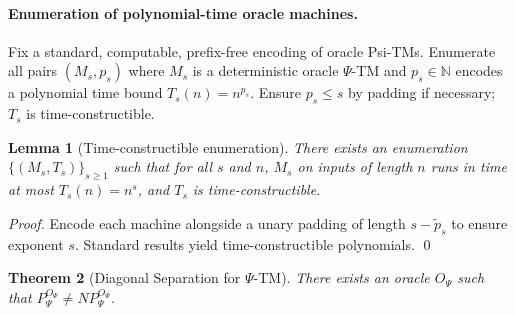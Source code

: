 \documentclass[11pt]{article}
\newtheorem{theorem}{Theorem}[section]
\newtheorem{lemma}[theorem]{Lemma}
\theoremstyle{definition}
\newcommand{\PSi}{\Psi}
\begin{document}
\paragraph{Enumeration of polynomial-time oracle machines.}
Fix a standard, computable, prefix-free encoding of oracle Psi-TMs. Enumerate all pairs $(M_s, p_s)$ where $M_s$ is a deterministic oracle $\PSi$-TM and $p_s\in\mathbb{N}$ encodes a polynomial time bound $T_s(n)=n^{p_s}$. Ensure $p_s\le s$ by padding if necessary; $T_s$ is time-constructible.

\begin{lemma}[Time-constructible enumeration]
\label{lem:enum}
There exists an enumeration $\{(M_s,T_s)\}_{s\ge1}$ such that for all $s$ and $n$, $M_s$ on inputs of length $n$ runs in time at most $T_s(n)=n^{s}$, and $T_s$ is time-constructible.
\end{lemma}
\begin{proof}
Encode each machine alongside a unary padding of length $s-\tilde p_s$ to ensure exponent $s$. Standard results yield time-constructible polynomials. \qed
\end{proof}

\begin{theorem}[Diagonal Separation for $\PSi$-TM]
\label{thm:diagonal}
There exists an oracle $O_\PSi$ such that $P^{O_\PSi}_\PSi \neq NP^{O_\PSi}_\PSi$.
\end{theorem}
\end{document}
